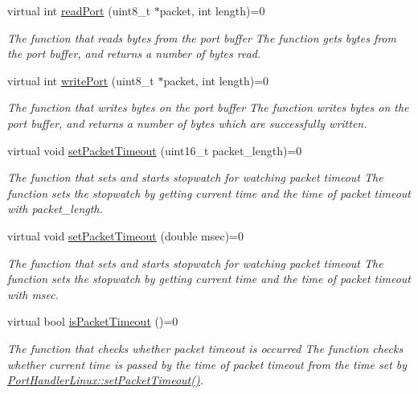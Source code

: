 \begin{DoxyCompactItemize}
virtual int \hyperlink{classmercury_1_1_port_handler_afa6f52d7b95c5ffd8f0c92477d517c79}{read\+Port} (uint8\+\_\+t $\ast$packet, int length)=0
\begin{DoxyCompactList}\small\item\em The function that reads bytes from the port buffer  The function gets bytes from the port buffer,  and returns a number of bytes read. \end{DoxyCompactList}\item 
virtual int \hyperlink{classmercury_1_1_port_handler_ad26c3a106d6b668b6fae3d2f0afeab9e}{write\+Port} (uint8\+\_\+t $\ast$packet, int length)=0
\begin{DoxyCompactList}\small\item\em The function that writes bytes on the port buffer  The function writes bytes on the port buffer,  and returns a number of bytes which are successfully written. \end{DoxyCompactList}\item 
virtual void \hyperlink{classmercury_1_1_port_handler_ae79ec2448529ffc2f1788da26142d164}{set\+Packet\+Timeout} (uint16\+\_\+t packet\+\_\+length)=0
\begin{DoxyCompactList}\small\item\em The function that sets and starts stopwatch for watching packet timeout  The function sets the stopwatch by getting current time and the time of packet timeout with packet\+\_\+length. \end{DoxyCompactList}\item 
virtual void \hyperlink{classmercury_1_1_port_handler_ae61a4953ef52be49401af210acf820a4}{set\+Packet\+Timeout} (double msec)=0
\begin{DoxyCompactList}\small\item\em The function that sets and starts stopwatch for watching packet timeout  The function sets the stopwatch by getting current time and the time of packet timeout with msec. \end{DoxyCompactList}\item 
virtual bool \hyperlink{classmercury_1_1_port_handler_a6733438255ede3d34738842e10cd8fc2}{is\+Packet\+Timeout} ()=0\hypertarget{classmercury_1_1_port_handler_a6733438255ede3d34738842e10cd8fc2}{}\label{classmercury_1_1_port_handler_a6733438255ede3d34738842e10cd8fc2}

\begin{DoxyCompactList}\small\item\em The function that checks whether packet timeout is occurred  The function checks whether current time is passed by the time of packet timeout from the time set by \hyperlink{classmercury_1_1_port_handler_linux_a3b3e75d2f295fb4453b2f5a531110c7e}{Port\+Handler\+Linux\+::set\+Packet\+Timeout()}. \end{DoxyCompactList}\end{DoxyCompactItemize}
